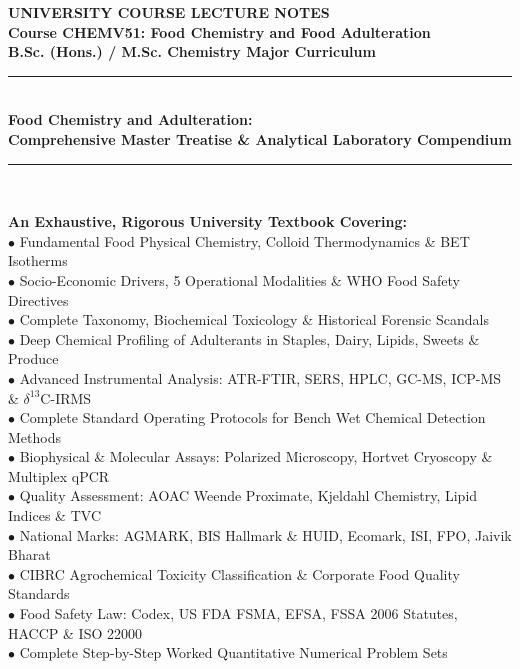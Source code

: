 \documentclass[11pt,a4paper,oneside]{article}
\begin{document}
\begin{titlepage}
    \centering
    \vspace*{1.5cm}
    
    {\Huge \bfseries \color{primarynavy} UNIVERSITY COURSE LECTURE NOTES}\\[0.4cm]
    {\LARGE \bfseries \color{secondaryteal} Course CHEMV51: Food Chemistry and Food Adulteration}\\[0.3cm]
    {\large \bfseries \color{darkslate} B.Sc. (Hons.) / M.Sc. Chemistry Major Curriculum}\\[1.2cm]
    
    \rule{\linewidth}{1.5pt}\\[0.6cm]
    {\Huge \bfseries \color{primarynavy} Food Chemistry and Adulteration:}\\[0.3cm]
    {\huge \bfseries \color{accentblue} Comprehensive Master Treatise \& Analytical Laboratory Compendium}\\[0.6cm]
    \rule{\linewidth}{1.5pt}\\[1.2cm]
    
    \begin{minipage}{0.9\textwidth}
    \centering
    \large\color{darkslate}
    \textbf{An Exhaustive, Rigorous University Textbook Covering:}\\
    \vspace{0.3cm}
    $\bullet$ Fundamental Food Physical Chemistry, Colloid Thermodynamics \& BET Isotherms\\
    $\bullet$ Socio-Economic Drivers, 5 Operational Modalities \& WHO Food Safety Directives\\
    $\bullet$ Complete Taxonomy, Biochemical Toxicology \& Historical Forensic Scandals\\
    $\bullet$ Deep Chemical Profiling of Adulterants in Staples, Dairy, Lipids, Sweets \& Produce\\
    $\bullet$ Advanced Instrumental Analysis: ATR-FTIR, SERS, HPLC, GC-MS, ICP-MS \& $\delta^{13}\text{C}$-IRMS\\
    $\bullet$ Complete Standard Operating Protocols for Bench Wet Chemical Detection Methods\\
    $\bullet$ Biophysical \& Molecular Assays: Polarized Microscopy, Hortvet Cryoscopy \& Multiplex qPCR\\
    $\bullet$ Quality Assessment: AOAC Weende Proximate, Kjeldahl Chemistry, Lipid Indices \& TVC\\
    $\bullet$ National Marks: AGMARK, BIS Hallmark \& HUID, Ecomark, ISI, FPO, Jaivik Bharat\\
    $\bullet$ CIBRC Agrochemical Toxicity Classification \& Corporate Food Quality Standards\\
    $\bullet$ Food Safety Law: Codex, US FDA FSMA, EFSA, FSSA 2006 Statutes, HACCP \& ISO 22000\\
    $\bullet$ Complete Step-by-Step Worked Quantitative Numerical Problem Sets
    \end{minipage}\\[1.5cm]
    

\end{titlepage}
\end{document}
